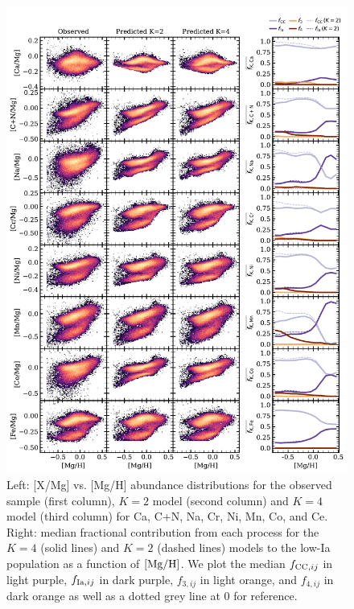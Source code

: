 \documentclass[modern]{aastex631}
\newcommand{\mgh}{[{\rm Mg}/{\rm H}]}
\newcommand{\fcc}{f_{{\rm CC}, ij}}
\begin{document}
\begin{figure}[htb!]
    \centering
    \includegraphics[width=\textwidth]{Paper/Figures/all_param_k4.pdf}
    \caption{Left: [X/Mg] vs. [Mg/H] abundance distributions for the observed sample (first column), $K=2$ model (second column) and $K=4$ model (third column) for Ca, C+N, Na, Cr, Ni, Mn, Co, and Ce. Right: median fractional contribution from each process for the $K=4$ (solid lines) and $K=2$ (dashed lines) models to the low-Ia population as a function of $\mgh$. We plot the median $\fcc$ in light purple, $f_{{\rm Ia}, ij}$ in dark purple, $f_{3, ij}$ in light orange, and $f_{4, ij}$ in dark orange as well as a dotted grey line at 0 for reference.} 
    \label{fig:all_paramK}
\end{figure}
\end{document}
